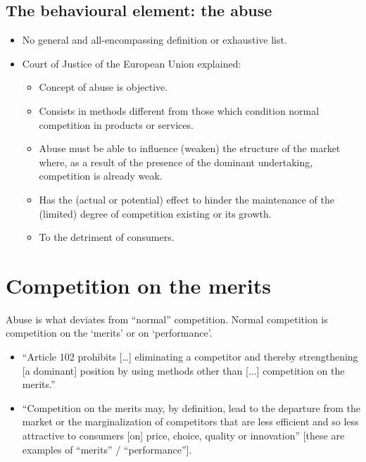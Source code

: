 \newpage
    \subsection{The behavioural element: the abuse}

        \begin{itemize}
            \item No general and all-encompassing definition or exhaustive list.
            \item Court of Justice of the European Union explained:
            \begin{itemize}
                \item Concept of abuse is objective.
                \item Consists in methods different from those which condition normal competition in products or services.
                \item Abuse must be able to influence (weaken) the structure of the market where, as a result of the presence of the dominant undertaking, competition is already weak.
                \item Has the (actual or potential) effect to hinder the maintenance of the (limited) degree of competition existing or its growth.
                \item To the detriment of consumers.
            \end{itemize}
        \end{itemize}

\section{Competition on the merits}

    Abuse is what deviates from “normal” competition.  
    Normal competition is competition on the ‘merits’ or on ‘performance’.
    
    \begin{itemize}
        \item “Article 102 prohibits […] eliminating a competitor and thereby strengthening [a dominant] position by using methods other than [...] competition on the merits.”
        \item “Competition on the merits may, by definition, lead to the departure from the market or the marginalization of competitors that are less efficient and so less attractive to consumers [on] price, choice, quality or innovation” [these are examples of “merits” / “performance”].
    \end{itemize}
    
